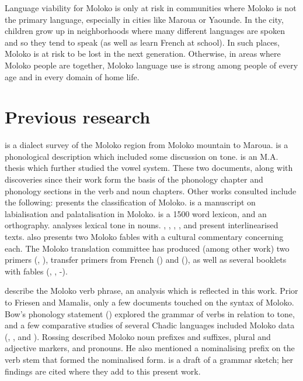 Language viability for Moloko is only at risk in communities where Moloko is not the primary language, especially in cities like Maroua or Yaounde.  In the city, children grow up in neighborhoods where many different languages are spoken and so they tend to speak  (as well as learn French at school).  In such places, Moloko is at risk to be lost in the next generation.  Otherwise, in areas where Moloko people are together, Moloko language use is strong among people of every age and in every domain of home life.

\section{Previous research}\label{sec:1.3}
\hypertarget{RefHeading1210301525720847}{}
\citet{Bradley1992} is a dialect survey of the Moloko region from Moloko mountain to Maroua. \citet{Bow1997c} is a phonological description which included some discussion on tone. \citet{Bow1999} is an M.A. thesis which further studied the vowel system.  These two documents, along with discoveries since their work form the basis of the phonology chapter and phonology sections in the verb and noun chapters. Other works consulted include the following:  \citet{Bow1997a} presents the classification of Moloko.\citet{Bow1997b} is a manuscript on labialisation and palatalisation in Moloko. \citet{StarrBoydBow2000} is a 1500 word lexicon, and \citet{Friesen2001} an orthography.  \citet{Boyd2002} analyses lexical tone in nouns.  \citet{Boyd2001}, \citet{OumarBoyd2002}, \citet{HolmakaBoyd2002}, \citet{Holmaka2002}, and \citet{Friesen2003} present interlinearised texts. \citet{Friesen2003} also presents two Moloko fables with a cultural commentary concerning each.  The Moloko translation committee has produced (among other work) two primers (\citet{MTC2004a}, \citet{MTC2008}), transfer primers from French (\citet{MTC2005a}) and  (\citet{MTC2007a}), as well as several booklets with fables (\citet{MTC2004b}, \citet{MTC2005b}, \citet{MTC2007a}-\citet{MTC2007d}).  

\citet{FriesenMamalis2008} describe the Moloko verb phrase, an analysis which is reflected in this work. Prior to Friesen and Mamalis, only a few documents touched on the syntax of Moloko. Bow’s phonology statement (\citeyear{Bow1997c}) explored the grammar of verbs in relation to tone, and a few comparative studies of several Chadic languages included Moloko data (\citealt{Rossing1978}, \citealt{Blama1980}, and \citealt{deColombel1982}). Rossing described Moloko noun prefixes and suffixes, plural and adjective markers, and pronouns.  He also mentioned a nominalising prefix on the verb stem that formed the nominalised form. \citet{Boyd2003} is a draft of a grammar sketch; her findings are cited where they add to this present work. 

